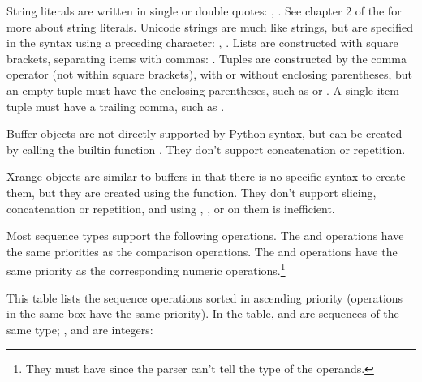 String literals are written in single or double quotes:
, .  See chapter 2 of the
 for more about
string literals.  Unicode strings are much like strings, but are
specified in the syntax using a preceding  character:
, .  Lists are constructed with square brackets,
separating items with commas: \code{[a, b, c]}.  Tuples are
constructed by the comma operator (not within square brackets), with
or without enclosing parentheses, but an empty tuple must have the
enclosing parentheses, such as  or \code{()}.  A single
item tuple must have a trailing comma, such as .

Buffer objects are not directly supported by Python syntax, but can be
created by calling the builtin function
.  They don't support
concatenation or repetition.

Xrange objects are similar to buffers in that there is no specific
syntax to create them, but they are created using the 
function.  They don't support slicing,
concatenation or repetition, and using , ,
 or  on them is inefficient.

Most sequence types support the following operations.  The  and
 operations have the same priorities as the comparison
operations.  The \samp{+} and \samp{*} operations have the same
priority as the corresponding numeric operations.\footnote{They must
have since the parser can't tell the type of the operands.}

This table lists the sequence operations sorted in ascending priority
(operations in the same box have the same priority).  In the table,
 and  are sequences of the same type; , 
and  are integers:

